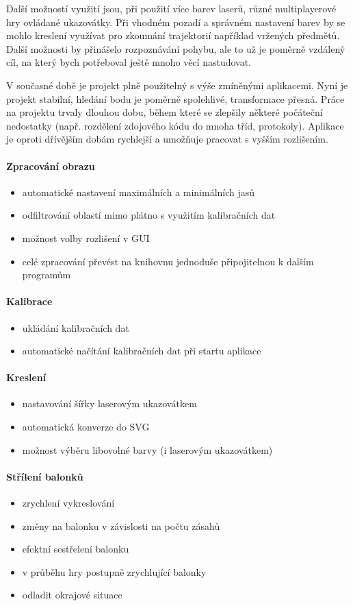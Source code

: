\documentclass[twoside,12pt]{article}
\newcommand{\podpodsekce}[1]{\paragraph{#1}\quad\vskip 6pt}
\begin{document}
Další možností využití jsou, při použití více barev laserů, různé multiplayerové hry ovládané ukazovátky. Při vhodném pozadí a správném nastavení barev by se mohlo kreslení využívat pro zkoumání trajektorií například vržených předmětů. Další možnosti by přinášelo rozpoznávání pohybu, ale to už je poměrně vzdálený cíl, na který bych potřeboval ještě mnoho věcí nastudovat.

V současné době je projekt plně použitelný s výše zmíněnými aplikacemi. Nyní je projekt stabilní, hledání bodu je poměrně spolehlivé, transformace přesná. Práce na projektu trvaly dlouhou dobu, během které se zlepšily některé počáteční nedostatky (např. rozdělení zdojového kódu do mnoha tříd, protokoly). Aplikace je oproti dřívějším dobám rychlejší a umožňuje pracovat s vyšším rozlišením. 

\podpodsekce{Zpracování obrazu}
\begin{itemize}
\item automatické nastavení maximálních a minimálních jasů
\item odfiltrování oblastí mimo plátno s využitím kalibračních dat
\item možnost volby rozlišení v GUI
\item celé zpracování převést na knihovnu jednoduše připojitelnou k dalším programům
\end{itemize}
\podpodsekce{Kalibrace}
\begin{itemize}
\item ukládání kalibračních dat
\item automatické načítání kalibračních dat při startu aplikace
\end{itemize}
\podpodsekce{Kreslení}
\begin{itemize}
\item nastavování šířky laserovým ukazovátkem
\item automatická konverze do SVG
\item možnost výběru libovolné barvy (i laserovým ukazovátkem)
\end{itemize}
\podpodsekce{Střílení balonků}
\begin{itemize}
\item zrychlení vykreslování
\item změny na balonku v závislosti na počtu zásahů
\item efektní sestřelení balonku
\item v průběhu hry postupně zrychlující balonky
\item odladit okrajové situace
\end{itemize}
\end{document}
